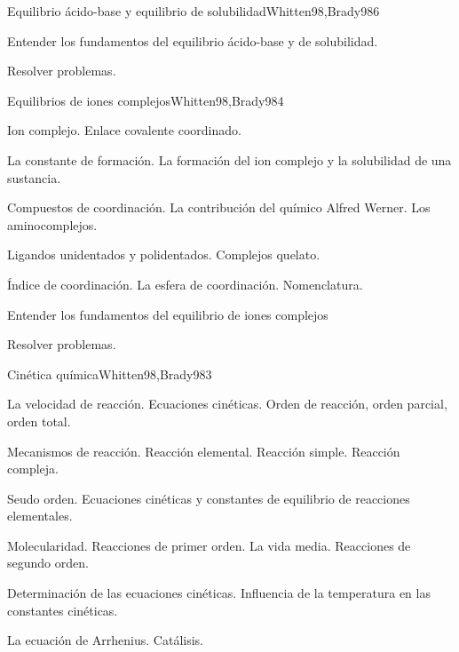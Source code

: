 \begin{syllabus}
\begin{unit}{Equilibrio ácido-base y equilibrio de solubilidad}{Whitten98,Brady98}{6}
\begin{unitgoals}
	\item Entender los fundamentos del equilibrio ácido-base y de solubilidad.
	\item Resolver problemas.
\end{unitgoals}
\end{unit}

\begin{unit}{Equilibrios de iones complejos}{Whitten98,Brady98}{4}
\begin{topics}
	\item Ion complejo. Enlace covalente coordinado.
	\item La constante de formación. La formación del ion complejo y la solubilidad de una sustancia.
	\item Compuestos de coordinación. La contribución del químico Alfred Werner. Los aminocomplejos.
	\item Ligandos unidentados y polidentados. Complejos quelato.
	\item Índice de coordinación. La esfera de coordinación. Nomenclatura.
   \end{topics}

   \begin{unitgoals}
      \item Entender los fundamentos del equilibrio de iones complejos
      \item Resolver problemas.
   \end{unitgoals}
\end{unit}

\begin{unit}{Cinética química}{Whitten98,Brady98}{3}
\begin{topics}
      \item La velocidad de  reacción. Ecuaciones cinéticas. Orden de reacción, orden parcial, orden total.
      \item Mecanismos de reacción. Reacción elemental. Reacción simple. Reacción compleja.
	\item Seudo orden. Ecuaciones cinéticas y constantes de equilibrio de reacciones elementales.
	\item Molecularidad. Reacciones de primer orden. La vida media. Reacciones de segundo orden.
	\item Determinación de las ecuaciones cinéticas. Influencia de la temperatura en las constantes cinéticas.
	\item La ecuación de Arrhenius. Catálisis.
  \end{topics}


\end{unit}
\end{syllabus}
